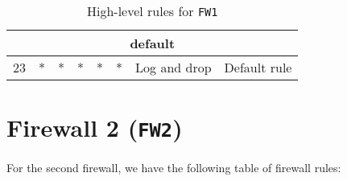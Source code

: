 \documentclass[a4paper, 11pt, oneside]{article}
\begin{document}
\begin{table}[H]
{\begin{tabular}{|llllllll|}
\multicolumn{8}{|c|}{{\color[HTML]{FE0000} default}}                                                                                                                                                                                                                                                                                                                                                                                                                                                                     \\ \hline
\multicolumn{1}{|l|}{23}          & \multicolumn{1}{l|}{*}                                                            & \multicolumn{1}{l|}{*}                                                              & \multicolumn{1}{l|}{*}                                                                 & \multicolumn{1}{l|}{*}                                                                   & \multicolumn{1}{l|}{*}                 & \multicolumn{1}{l|}{Log and drop}    & Default rule                           \\ \hline
\end{tabular}
}
\caption{High-level rules for \texttt{FW1}}
\end{table}

\section{Firewall 2 (\texttt{FW2})}
\paragraph{}For the second firewall, we have the following table of firewall rules:
\end{document}
